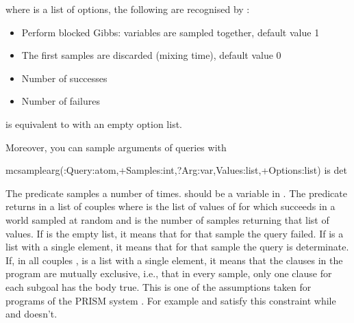 \documentclass[letterpaper,10pt,english]{sphinxmanual}
\begin{document}
where  is a list of options, the following are recognised by :
\begin{itemize}
\item {} 
 Perform blocked Gibbs:  variables are sampled together, default value 1

\item {} 
 The first  samples are discarded (mixing time), default value 0

\item {} 
 Number of successes

\item {} 
 Number of failures

\end{itemize}

 is equivalent to  with an empty option list.

Moreover, you can sample arguments of queries with

\begin{sphinxVerbatim}[commandchars=\\\{\}]
mc\PYGZus{}sample\PYGZus{}arg(:Query:atom,+Samples:int,?Arg:var,\PYGZhy{}Values:list,+Options:list) is det
\end{sphinxVerbatim}

The predicate samples  a number of  times.  should be a variable in .
The predicate returns in  a list of couples  where  is the list of values of  for which  succeeds in a world sampled at random and  is the number of samples returning that list of values. If  is the empty list, it means that for that sample the query failed.
If  is a list with a single element, it means that for that sample the query is determinate.
If, in all couples ,  is a list with a single element, it means that the clauses in the program are mutually exclusive, i.e., that in every sample, only one clause for each subgoal has the body true.
This is one of the assumptions taken for programs of the PRISM system .
For example  and  satisfy this constraint while  and  doesn’t.
\end{document}
